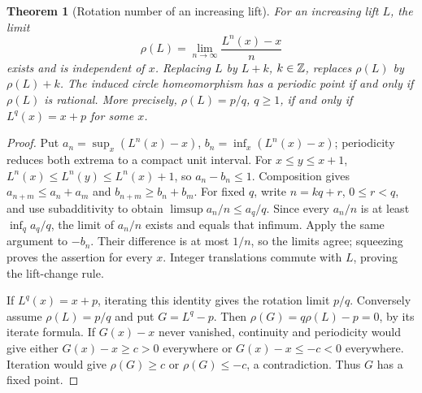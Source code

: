 \documentclass[11pt,oneside]{book}
\newtheorem{theorem}{Theorem}[chapter]
\theoremstyle{definition}
\theoremstyle{remark}\newtheorem{remark}[theorem]{Remark}
\begin{document}
\begin{theorem}[Rotation number of an increasing lift]\label{d13:15:rotation-number}
For an increasing lift \(L\), the limit
\[
 \rho(L)=\lim_{n\to\infty}\frac{L^n(x)-x}{n}
\]
exists and is independent of \(x\). Replacing \(L\) by \(L+k\),
\(k\in\mathbb Z\), replaces \(\rho(L)\) by \(\rho(L)+k\).
The induced circle homeomorphism has a periodic point if and only if
\(\rho(L)\) is rational. More precisely, \(\rho(L)=p/q\), \(q\geq1\),
if and only if \(L^q(x)=x+p\) for some \(x\).
\end{theorem}
\begin{proof}
Put \(a_n=\sup_x(L^n(x)-x)\), \(b_n=\inf_x(L^n(x)-x)\); periodicity
reduces both extrema to a compact unit interval. For \(x\leq y\leq x+1\),
\(L^n(x)\leq L^n(y)\leq L^n(x)+1\), so \(a_n-b_n\leq1\).
Composition gives \(a_{n+m}\leq a_n+a_m\) and
\(b_{n+m}\geq b_n+b_m\). For fixed \(q\), write \(n=kq+r\),
\(0\leq r<q\), and use subadditivity to obtain
\(\limsup a_n/n\leq a_q/q\). Since every \(a_n/n\) is at least
\(\inf_q a_q/q\), the limit of \(a_n/n\) exists and equals that infimum.
Apply the same argument to \(-b_n\). Their difference is at most \(1/n\),
so the limits agree; squeezing proves the assertion for every \(x\).
Integer translations commute with \(L\), proving the lift-change rule.

If \(L^q(x)=x+p\), iterating this identity gives the rotation limit
\(p/q\). Conversely assume \(\rho(L)=p/q\) and put \(G=L^q-p\).
Then \(\rho(G)=q\rho(L)-p=0\), by its iterate formula. If \(G(x)-x\)
never vanished, continuity and periodicity would give either
\(G(x)-x\geq c>0\) everywhere or \(G(x)-x\leq-c<0\) everywhere.
Iteration would give \(\rho(G)\geq c\) or \(\rho(G)\leq-c\), a
contradiction. Thus \(G\) has a fixed point.
\end{proof}
\end{document}
